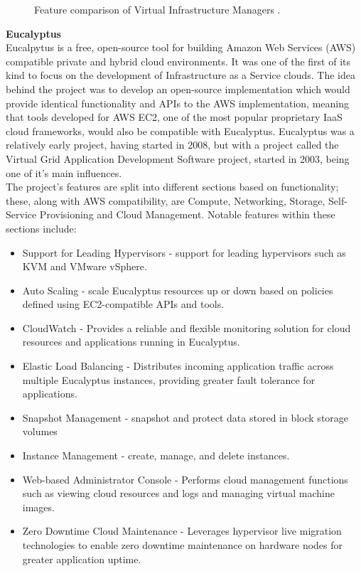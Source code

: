 \begin{figure}[ht]
\centering
{}
\caption{Feature comparison of Virtual Infrastructure Managers \cite{principlesparadigms}.}
\end{figure}

\textbf{Eucalyptus}\\
Eucalpytus\cite{eucopensourcesystem} is a free, open-source tool for building Amazon Web Services (AWS) compatible private and hybrid cloud environments. It was one of the first of its kind to focus on the development of Infrastructure as a Service clouds. 
The idea behind the project was to develop an open-source implementation which would provide identical functionality and APIs to the AWS implementation, meaning that tools developed for AWS EC2, one of the most popular proprietary IaaS cloud frameworks, would also be compatible with Eucalyptus. Eucalyptus was a relatively early project, having started in 2008, but with a project called the Virtual Grid Application Development Software project, started in 2003, being one of it's main influences\cite{eucopensourcecloudsystem}.   \\ 
The project's features are split into different sections based on functionality; these, along with AWS compatibility, are Compute, Networking, Storage, Self-Service Provisioning and Cloud Management\cite{eucalyptusfeatures}. Notable features within these sections include\cite{eucalyptusfeatures}:

\begin{itemize}
\itemsep0em
\item Support for Leading Hypervisors - support for leading hypervisors such as KVM and VMware vSphere.
\item Auto Scaling - scale Eucalyptus resources up or down based on policies defined using EC2-compatible APIs and tools. 
\item CloudWatch - Provides a reliable and flexible monitoring solution for cloud resources and applications running in Eucalyptus. 
\item Elastic Load Balancing - Distributes incoming application traffic across multiple Eucalyptus instances, providing greater fault tolerance for applications.
\item Snapshot Management - snapshot and protect data stored in block storage volumes
\item Instance Management - create, manage, and delete instances.
\item Web-based Administrator Console - Performs cloud management functions such as viewing cloud resources and logs and managing virtual machine images.
\item Zero Downtime Cloud Maintenance - Leverages hypervisor live migration technologies to enable zero downtime maintenance on hardware nodes for greater application uptime.
\end{itemize}

